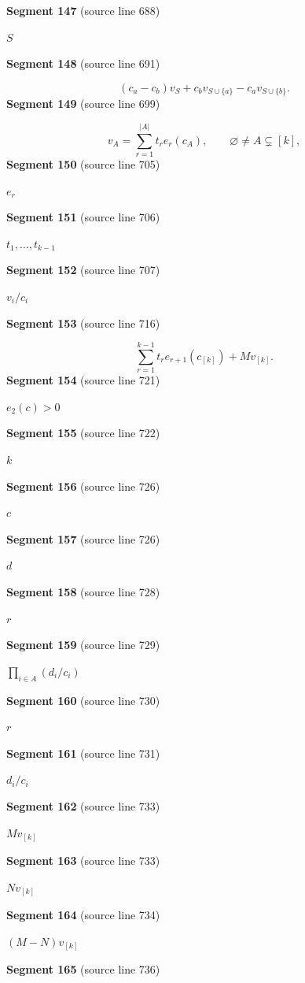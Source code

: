 \documentclass[11pt]{article}
\begin{document}
\textbf{Segment 147} (source line 688)\par
\( S \)\par
\textbf{Segment 148} (source line 691)\par
\[
(c_a-c_b)v_S+c_bv_{S\cup\{a\}}-c_av_{S\cup\{b\}}.
\tag{11}
\]
\textbf{Segment 149} (source line 699)\par
\[
v_A=\sum_{r=1}^{|A|}t_r e_r(c_A),
\qquad \varnothing\ne A\subsetneq[k],
\tag{12}
\]
\textbf{Segment 150} (source line 705)\par
\( e_r \)\par
\textbf{Segment 151} (source line 706)\par
\( t_1,\ldots,t_{k-1} \)\par
\textbf{Segment 152} (source line 707)\par
\( v_i/c_i \)\par
\textbf{Segment 153} (source line 716)\par
\[
\sum_{r=1}^{k-1}t_r e_{r+1}(c_{[k]})+Mv_{[k]}.
\tag{13}
\]
\textbf{Segment 154} (source line 721)\par
\( e_2(c)>0 \)\par
\textbf{Segment 155} (source line 722)\par
\( k \)\par
\textbf{Segment 156} (source line 726)\par
\( c \)\par
\textbf{Segment 157} (source line 726)\par
\( d \)\par
\textbf{Segment 158} (source line 728)\par
\( r \)\par
\textbf{Segment 159} (source line 729)\par
\( \prod_{i\in A}(d_i/c_i) \)\par
\textbf{Segment 160} (source line 730)\par
\( r \)\par
\textbf{Segment 161} (source line 731)\par
\( d_i/c_i \)\par
\textbf{Segment 162} (source line 733)\par
\( Mv_{[k]} \)\par
\textbf{Segment 163} (source line 733)\par
\( Nv_{[k]} \)\par
\textbf{Segment 164} (source line 734)\par
\( (M-N)v_{[k]} \)\par
\textbf{Segment 165} (source line 736)\par
\end{document}
